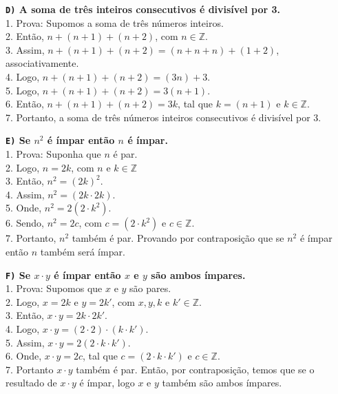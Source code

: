 \documentclass[12pt, a4paper]{article}
\newcommand{\Z}{\mathbb{Z}}
\begin{document}
\begin{flushleft}
\vskip8mm

\textbf{\textbf{\texttt{D)}} A soma de três inteiros consecutivos é divisível por 3.\\}
\textsf{1. Prova: Supomos a soma de três números inteiros.
\\2. Então, $ n + (n + 1) + (n + 2)$, com $n \in \Z$.
\\3. Assim, $ n + (n + 1) + (n + 2) = (n+n+n) + (1+2)$, associativamente.
\\4. Logo,  $ n + (n + 1) + (n + 2) = (3n) + 3$.
\\5. Logo, $ n + (n + 1) + (n + 2) = 3(n+1)$.
\\6. Então, $n + (n + 1) + (n + 2) = 3k $, tal que $ k = (n+1)$ e $k \in \Z$.
\\7. Portanto, a soma de três números inteiros consecutivos é divisível por $3$. }



\vskip8mm
\textbf{\textbf{\texttt{E)}} Se $n^2$ é ímpar então $n$ é ímpar.\\}
\textsf{1. Prova: Suponha que $n$ é par.
\\2. Logo, $n=2k$, com $n$ e $k \in \Z$
\\3. Então, $n^2 = (2k)^2$.
\\4. Assim, $n^2 = (2k \cdot 2k)$.
\\5. Onde, $n^2 = 2(2 \cdot k^2)$.
\\6. Sendo, $n^2 = 2c$, com $c = (2 \cdot k^2)$ e $c \in \Z$.
\\7. Portanto, $n^2$ também é par. Provando por contraposição que se $n^2$ é ímpar então $n$ também será ímpar.}

\pagebreak

\textbf{\textbf{\texttt{F)}} Se $x \cdot y$ é ímpar então $x$ e $y$ são ambos ímpares.\\}
\textsf{1. Prova: Supomos que $x$ e $y$ são pares.
\\2. Logo, $x = 2k$ e $y = 2k'$, com $x, y, k$ e $k' \in \Z$.
\\3. Então, $x \cdot y = 2k \cdot 2k'$.
\\4. Logo, $x \cdot y = (2 \cdot 2) \cdot (k \cdot k')$.
\\5. Assim, $x \cdot y = 2(2 \cdot k \cdot k')$.
\\6. Onde, $x \cdot y = 2c$, tal que $c = (2 \cdot k \cdot k')$ e $c \in \Z$.
\\7. Portanto $x \cdot y$ também é par. Então, por contraposição, temos que se o resultado de $x \cdot y$ é ímpar, logo $x$ e $y$ também são ambos ímpares.}





\end{flushleft}
\end{document}
